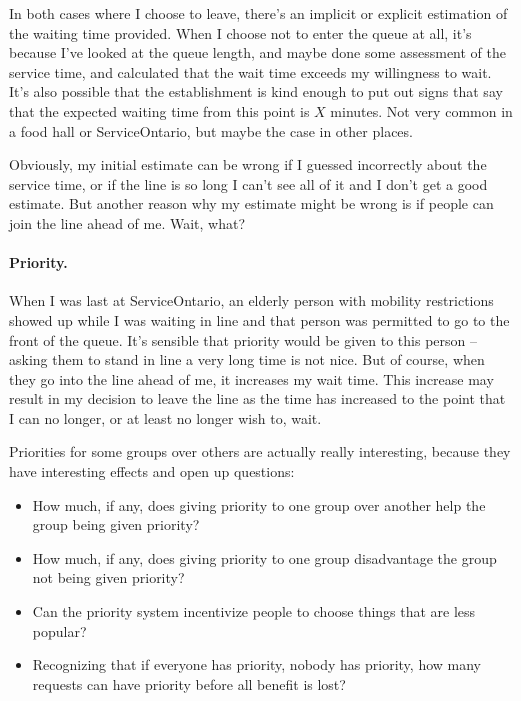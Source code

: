 In both cases where I choose to leave, there's an implicit or explicit estimation of the waiting time provided. When I choose not to enter the queue at all, it's because I've looked at the queue length, and maybe done some assessment of the service time, and calculated that the wait time exceeds my willingness to wait. It's also possible that the establishment is kind enough to put out signs that say that the expected waiting time from this point is $X$ minutes. Not very common in a food hall or ServiceOntario, but maybe the case in other places.

Obviously, my initial estimate can be wrong if I guessed incorrectly about the service time, or if the line is so long I can't see all of it and I don't get a good estimate. But another reason why my estimate might be wrong is if people can join the line ahead of me. Wait, what?

\paragraph{Priority.}
When I was last at ServiceOntario, an elderly person with mobility restrictions showed up while I was waiting in line and that person was permitted to go to the front of the queue. It's sensible that priority would be given to this person -- asking them to stand in line a very long time is not nice. But of course, when they go into the line ahead of me, it increases my wait time. This increase may result in my decision to leave the line as the time has increased to the point that I can no longer, or at least no longer wish to, wait. 

Priorities for some groups over others are actually really interesting, because they have interesting effects and open up questions:

\begin{itemize}
	\item How much, if any, does giving priority to one group over another help the group being given priority?
	\item How much, if any, does giving priority to one group disadvantage the group not being given priority?
	\item Can the priority system incentivize people to choose things that are less popular?
	\item Recognizing that if everyone has priority, nobody has priority, how many requests can have priority before all benefit is lost?
\end{itemize}


